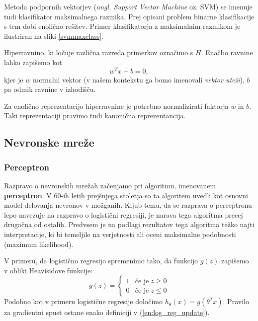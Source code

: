 \documentclass[11pt,a4paper,openany]{book}
\begin{document}
Metoda podpornih vektorjev (\textit{angl. Support Vector Machine} oz. SVM) se imenuje tudi klasifikator maksimalnega razmika. Prej opisani problem binarne klasifikacije s tem dobi enolično rešitev. Primer klasifikatorja z maksimalnim razmikom je ilustriran na sliki \ref{svmmaxclass}.



Hiperravnino, ki ločuje različna razreda primerkov označimo s $H$. Enačbo ravnine lahko zapišemo kot
\begin{equation}
  w^T x + b = 0,
\end{equation}
kjer je $w$ normalni vektor (v našem kontekstu ga bomo imenovali \textit{vektor uteži}), $b$ pa odmik ravnine v izhodišču.

Za enolično reprezentacijo hiperravnine je potrebno normalizirati faktorja $w$ in $b$. Taki reprezentaciji pravimo tudi kanonična reprezentancija.


\subsection{Nevronske mreže}

\subsubsection{Perceptron}
Razpravo o nevronskih mrežah začenjamo pri algoritmu, imenovanem \textbf{perceptron}. V 60-ih letih prejšnjega stoletja so ta algoritem uvedli kot osnovni model delovanja nevronov v možganih. Kljub temu, da se razprava o perceptronu lepo navezuje na razpravo o logistični regresiji, je narava tega algoritma precej drugačna od ostalih. Predvsem je na podlagi rezultatov tega algoritma težko najti interpretacije, ki bi temeljile na verjetnosti ali oceni maksimalne podobnosti (maximum likelihood).

V primeru, da logistično regresijo spremenimo tako, da funkcijo $g(z)$ zapišemo v obliki Heavisidove funkcije:
\begin{equation}
	g(z) = \left\{
		\begin{array}{ll}
			1 & \text{če je} \; z \geq 0 \\
			0 & \text{če je} \; z \le 0
		\end{array}
	\right.
\end{equation}
Podobno kot v primeru logistične regresije določimo $h_\theta(x) = g(\theta^Tx)$. Pravilo za gradientni spust ostane enako definiciji v (\ref{en:log_reg_update}).
\end{document}

